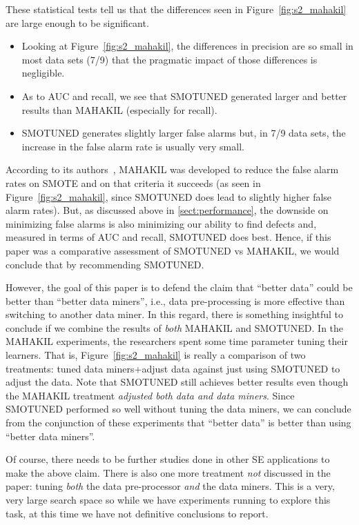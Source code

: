 \documentclass[sigconf]{acmart}
\newcommand{\bi}{\begin{itemize}[leftmargin=0.4cm]}
\newcommand{\ei}{\end{itemize}}
\theoremstyle{break}
\newcommand{\smb}{{\sc SMOTUNED}}
\begin{document}
These statistical tests tell us that the differences seen in Figure~\ref{fig:s2_mahakil}  are large enough to be significant.  
\bi
\item
  Looking at Figure~\ref{fig:s2_mahakil}, the differences in precision
  are   so small
in most data sets (7/9) that the pragmatic impact of those differences   is negligible.
\item
As to AUC and recall,  we see that 
{\smb} generated   larger and better results than MAHAKIL (especially for recall).
\item
{\smb} generates slightly larger false alarms but, in 7/9 data sets,
the increase in the false alarm rate is usually very small.
\ei
According to its authors~\cite{bennin2017mahakil},
MAHAKIL was developed to reduce the false alarm rates on SMOTE and on that criteria it succeeds
 (as seen in  Figure~\ref{fig:s2_mahakil}, since {\smb} does lead to slightly higher false
alarm rates).   But, as discussed above in \ref{sect:performance}, the downside on minimizing false alarms is also minimizing our ability to 
find defects and, measured in terms of AUC and recall, {\smb} does best.
  Hence,  if this paper was a comparative assessment of  {\smb} vs MAHAKIL, we would conclude that
  by recommending {\smb}.

However, the goal of this paper is to defend the claim that ``better data'' could be better than ``better
data miners'', i.e., data pre-processing is more effective  than switching to another data miner.
In this regard,   there is something insightful to conclude if we combine the results of {\em both}
MAHAKIL and {\smb}.  
In the MAHAKIL experiments, the researchers spent some time parameter
tuning their learners. That is,  Figure~\ref{fig:s2_mahakil} is really a comparison
of two treatments: tuned data miners+adjust data against just using {\smb} to adjust the data.
Note that {\smb} still achieves better results  even though the MAHAKIL treatment {\em adjusted both
data and data miners}. Since {\smb} performed so well without tuning the data miners,
we can conclude from the conjunction of these experiments that  ``better data'' is better than using   ``better
data miners''.

Of course, there needs to be further studies done in other SE applications to make the above claim. There is also one more treatment {\em not} discussed in the paper: tuning {\em both}
the data pre-processor {\em and} the data miners. This is a very, very large search space
so while we have experiments running to explore this task, at this time we have not definitive
conclusions to report.
\end{document}

